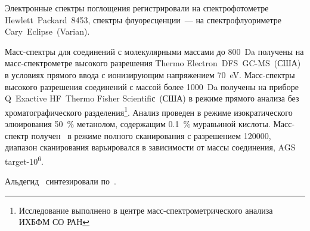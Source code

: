 Электронные спектры поглощения регистрировали на спектрофотометре Hewlett~Packard~8453, спектры флуоресценции~--- на спектрофлуориметре Cary~Eclipse~(Varian).

Масс-спектры для соединений с молекулярными массами до \SI{800}{\dalton} получены на масс-спектрометре высокого разрешения Thermo Electron~DFS~GC-MS~(США) в условиях прямого ввода с ионизирующим напряжением \SI{70}{\electronvolt}.
Масс­-спектры высокого разрешения соединений с массой более \SI{1000}{\dalton} получены на приборе Q~Exactive HF~Thermo Fisher Scientifiс~(США) в режиме прямого анализа без хроматографического разделения\footnote{Исследование выполнено в центре масс-спектрометрического анализа ИХБФМ СО РАН}.
Анализ проведен в режиме изократического элюирования \SI{50}{\percent} метанолом, содержащим \SI{0.1}{\percent} муравьиной кислоты. Масс-спектр получен  в режиме полного сканирования с разрешением \num{120000}, диапазон сканирования варьировался в зависимости от массы соединения, AGS target-10\textsuperscript{6}.

Альдегид~ синтезировали по~\cite{2016a,2010}.

